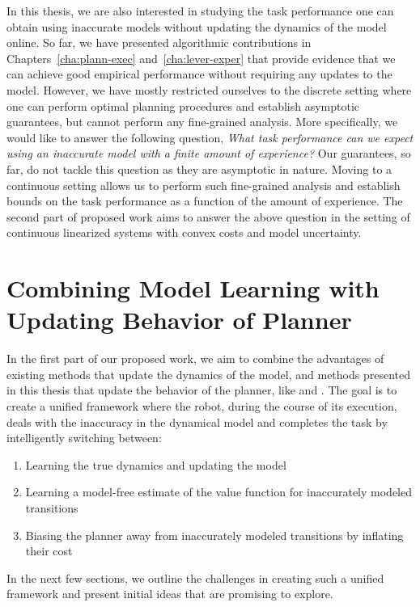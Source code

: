 In this thesis, we are also interested in studying the task
performance one can obtain using inaccurate models without
updating the dynamics of the model online. So far, we have presented
algorithmic contributions in Chapters~\ref{cha:plann-exec}
and~\ref{cha:lever-exper} that provide evidence that we can achieve 
good empirical performance without requiring any updates to the
model. However, we have mostly
restricted ourselves to the discrete setting where one can perform
optimal planning procedures and establish asymptotic guarantees, but
cannot perform any fine-grained analysis. More specifically, we would
like to answer the following question, \textit{What task performance
  can we expect using an inaccurate model with a finite amount of
  experience?} Our guarantees, so far, do not tackle this
question as they are asymptotic in nature. Moving to a continuous
setting allows us to perform such fine-grained analysis and establish
bounds on the task performance as a function of the amount of
experience. The second part of proposed work aims to answer the above
question in the setting of continuous linearized systems with convex
costs and model uncertainty.

\section{Combining Model Learning with Updating Behavior of Planner}
\label{sec:updat-dynam-model}

In the first part of our proposed work, we aim to combine the advantages of
existing methods that update the dynamics of the model, and methods
presented in this thesis that update the behavior of the planner, like
\cmax{} and \cmaxpp{}. The goal is to create a unified framework where
the robot, during the course of its execution, deals with the
inaccuracy in the dynamical model and completes the task by
intelligently switching between: 
\begin{enumerate}
\item Learning the true dynamics and updating the model
\item Learning a model-free estimate of the value function for
  inaccurately modeled transitions
\item Biasing the planner away from inaccurately modeled transitions
  by inflating their cost
\end{enumerate}

In the next few sections, we outline the challenges in creating such a
unified framework and present initial ideas that are promising to
explore.

